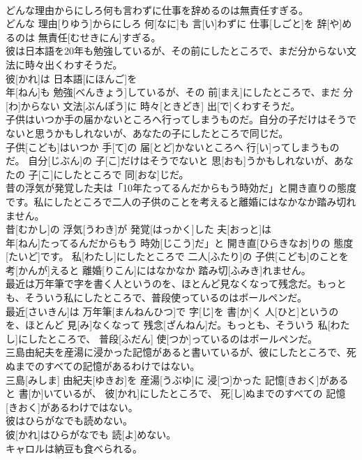 \documentclass[8pt]{extreport}
\begin{document}
\begin{CJK}{UTF8}{min}
\\	どんな理由からにしろ何も言わずに仕事を辞めるのは無責任すぎる。	
\\	どんな 理由[りゆう]からにしろ 何[なに]も 言[い]わずに 仕事[しごと]を 辞[や]めるのは 無責任[むせきにん]すぎる。
\\	彼は日本語を20年も勉強しているが、その前にしたところで、まだ分からない文法に時々出くわすそうだ。	
\\	彼[かれ]は 日本語[にほんご]を 
\\	年[ねん]も 勉強[べんきょう]しているが、その 前[まえ]にしたところで、まだ 分[わ]からない 文法[ぶんぽう]に 時々[ときどき] 出[で]くわすそうだ。
\\	子供はいつか手の届かないところへ行ってしまうものだ。自分の子だけはそうでないと思うかもしれないが、あなたの子にしたところで同じだ。	
\\	子供[こども]はいつか 手[て]の 届[とど]かないところへ 行[い]ってしまうものだ。 自分[じぶん]の 子[こ]だけはそうでないと 思[おも]うかもしれないが、あなたの 子[こ]にしたところで 同[おな]じだ。
\\	昔の浮気が発覚した夫は「10年たってるんだからもう時効だ」と開き直りの態度です。私にしたところで二人の子供のことを考えると離婚にはなかなか踏み切れません。	
\\	昔[むかし]の 浮気[うわき]が 発覚[はっかく]した 夫[おっと]は
\\	年[ねん]たってるんだからもう 時効[じこう]だ」と 開き直[ひらきなお]りの 態度[たいど]です。 私[わたし]にしたところで 二人[ふたり]の 子供[こども]のことを 考[かんが]えると 離婚[りこん]にはなかなか 踏み切[ふみき]れません。
\\	最近は万年筆で字を書く人というのを、ほとんど見なくなって残念だ。もっとも、そういう私にしたところで、普段使っているのはボールペンだ。	
\\	最近[さいきん]は 万年筆[まんねんひつ]で 字[じ]を 書[か]く 人[ひと]というのを、ほとんど 見[み]なくなって 残念[ざんねん]だ。もっとも、そういう 私[わたし]にしたところで、 普段[ふだん] 使[つか]っているのはボールペンだ。
\\	三島由紀夫を産湯に浸かった記憶があると書いているが、彼にしたところで、死ぬまでのすべての記憶があるわけではない。	
\\	三島[みしま] 由紀夫[ゆきお]を 産湯[うぶゆ]に 浸[つ]かった 記憶[きおく]があると 書[か]いているが、 彼[かれ]にしたところで、 死[し]ぬまでのすべての 記憶[きおく]があるわけではない。
\\	彼はひらがなでも読めない。	
\\	彼[かれ]はひらがなでも 読[よ]めない。
\\	キャロルは納豆も食べられる。	

\end{CJK}
\end{document}
